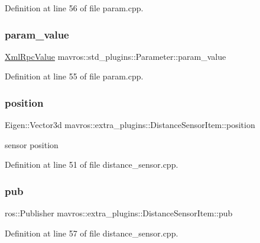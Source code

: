 Definition at line 56 of file param.\+cpp.

\mbox{\label{group__plugin_ga91eae662f2d0f3b1a796940ab770c9f2}} 
\subsubsection{\texorpdfstring{param\_value}{param\_value}}
{\footnotesize\ttfamily \mbox{\hyperlink{group__plugin_gafe570e1ad21e55964c02084e1a485c92}{Xml\+Rpc\+Value}} mavros\+::std\+\_\+plugins\+::\+Parameter\+::param\+\_\+value}



Definition at line 55 of file param.\+cpp.

\mbox{\label{group__plugin_ga0d2d16da9abd307183e28dca358cc82d}} 
\subsubsection{\texorpdfstring{position}{position}}
{\footnotesize\ttfamily Eigen\+::\+Vector3d mavros\+::extra\+\_\+plugins\+::\+Distance\+Sensor\+Item\+::position}



sensor position 



Definition at line 51 of file distance\+\_\+sensor.\+cpp.

\mbox{\label{group__plugin_ga0604c0a60bf1edd2f50b3d0fe4171eec}} 
\subsubsection{\texorpdfstring{pub}{pub}}
{\footnotesize\ttfamily ros\+::\+Publisher mavros\+::extra\+\_\+plugins\+::\+Distance\+Sensor\+Item\+::pub}



Definition at line 57 of file distance\+\_\+sensor.\+cpp.

\mbox{\label{group__plugin_gabaad85a3fcad787b3090475a09c9a0d2}} 
